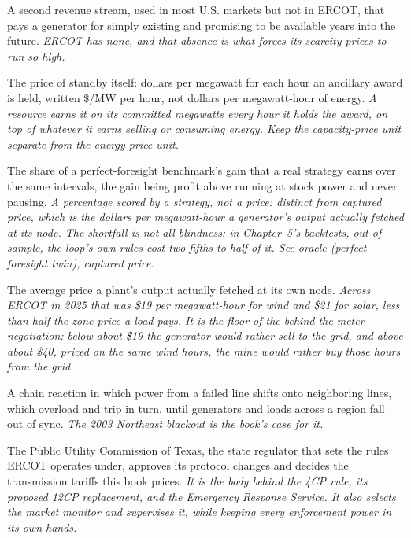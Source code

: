 \begin{description}[leftmargin=0pt,style=unboxed,itemsep=0.35em,parsep=0.15em]
\item[capacity market] \hypertarget{glossary:capacity-market}{}A second revenue stream, used in most U.S. markets but not in ERCOT, that pays a generator for simply existing and promising to be available years into the future. \emph{ERCOT has none, and that absence is what forces its scarcity prices to run so high.}
\item[capacity price] \hypertarget{glossary:capacity-price}{}The price of standby itself: dollars per megawatt for each hour an ancillary award is held, written \$/MW per hour, not dollars per megawatt-hour of energy. \emph{A resource earns it on its committed megawatts every hour it holds the award, on top of whatever it earns selling or consuming energy. Keep the capacity-price unit separate from the energy-price unit.}
\item[capture] \hypertarget{glossary:capture}{}The share of a perfect-foresight benchmark's gain that a real strategy earns over the same intervals, the gain being profit above running at stock power and never pausing. \emph{A percentage scored by a strategy, not a price: distinct from captured price, which is the dollars per megawatt-hour a generator's output actually fetched at its node. The shortfall is not all blindness: in Chapter~5's backtests, out of sample, the loop's own rules cost two-fifths to half of it. See oracle (perfect-foresight twin), captured price.}
\item[captured price] \hypertarget{glossary:captured-price}{}The average price a plant's output actually fetched at its own node. \emph{Across ERCOT in 2025 that was \$19 per megawatt-hour for wind and \$21 for solar, less than half the zone price a load pays. It is the floor of the behind-the-meter negotiation: below about \$19 the generator would rather sell to the grid, and above about \$40, priced on the same wind hours, the mine would rather buy those hours from the grid.}
\item[cascading failure] \hypertarget{glossary:cascading-failure}{}A chain reaction in which power from a failed line shifts onto neighboring lines, which overload and trip in turn, until generators and loads across a region fall out of sync. \emph{The 2003 Northeast blackout is the book's case for it.}
\item[the commission] \hypertarget{glossary:the-commission}{}The Public Utility Commission of Texas, the state regulator that sets the rules ERCOT operates under, approves its protocol changes and decides the transmission tariffs this book prices. \emph{It is the body behind the 4CP rule, its proposed 12CP replacement, and the Emergency Response Service. It also selects the market monitor and supervises it, while keeping every enforcement power in its own hands.}

\end{description}
